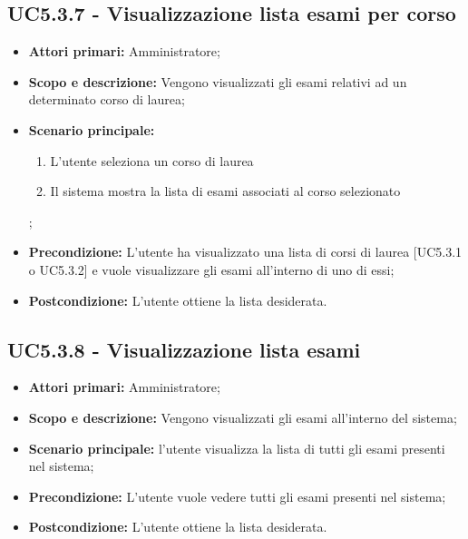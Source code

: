 \documentclass[AnalisiDeiRequisiti.tex]{subfiles}
\begin{document}
\subsection{UC5.3.7 - Visualizzazione lista esami per corso}
\begin{itemize}
	\item \textbf{Attori primari:} Amministratore;
	\item \textbf{Scopo e descrizione:} Vengono visualizzati gli esami relativi ad un determinato corso di laurea;
	\item \textbf{Scenario principale:}
	\begin{enumerate}
		\item L'utente seleziona un corso di laurea
		\item Il sistema mostra la lista di esami associati al corso selezionato
	\end{enumerate};
	\item \textbf{Precondizione:} L'utente ha visualizzato una lista di corsi di laurea [UC5.3.1 o UC5.3.2] e vuole visualizzare gli esami all'interno di uno di essi; 
	\item \textbf{Postcondizione:} L'utente ottiene la lista desiderata.
\end{itemize}
\subsection{UC5.3.8 - Visualizzazione lista esami}
\begin{itemize}
	\item \textbf{Attori primari:} Amministratore;
	\item \textbf{Scopo e descrizione:} Vengono visualizzati gli esami all'interno del sistema;
	\item \textbf{Scenario principale:} l'utente visualizza la lista di tutti gli esami presenti nel sistema;
	\item \textbf{Precondizione:} L'utente vuole vedere tutti gli esami presenti nel sistema; 
	\item \textbf{Postcondizione:} L'utente ottiene la lista desiderata.
\end{itemize}
\end{document}
